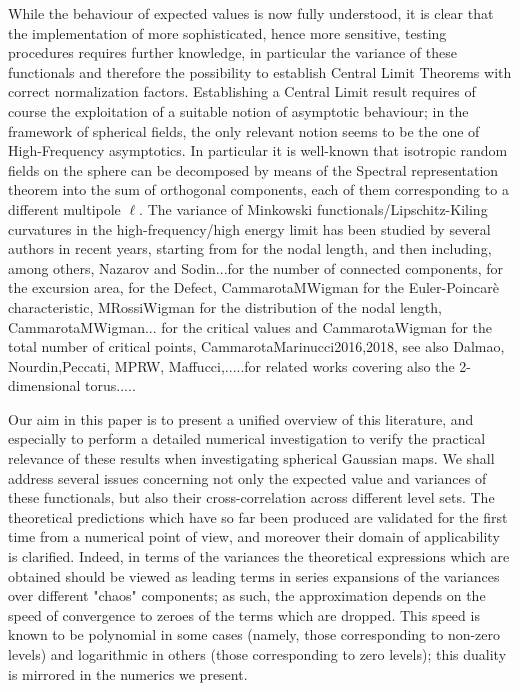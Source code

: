 \documentclass[aps,prd,showpacs,superscriptaddress,groupedaddress]{revtex4-1}  %
\begin{document}
While the behaviour of expected values is now fully understood, it is clear that the implementation of more sophisticated, hence more sensitive, testing procedures requires further knowledge, in particular the variance of these functionals and therefore the possibility to establish Central Limit Theorems with correct normalization factors. Establishing a Central Limit result requires of course the exploitation of a suitable notion of asymptotic behaviour; in the framework of spherical fields, the only relevant notion seems to be the one of High-Frequency asymptotics. In particular it is well-known that isotropic random fields on the sphere can be decomposed by means of the Spectral representation theorem into the sum of orthogonal components, each of them corresponding to a different multipole $\ell$. The variance of Minkowski functionals/Lipschitz-Kiling curvatures in the high-frequency/high energy limit has been studied by several authors in recent years, starting from \cite{W} for the nodal length, and then including, among others, Nazarov and Sodin...for the number of connected components, \cite{M e W 2011} for the excursion area, \cite{M e W 2011bis} for the Defect, CammarotaMWigman for the Euler-Poincarè characteristic, MRossiWigman for the distribution of the nodal length, CammarotaMWigman... for the critical values and CammarotaWigman for the total number of critical points, CammarotaMarinucci2016,2018, see also Dalmao, Nourdin,Peccati, MPRW, Maffucci,.....for related works covering also the 2-dimensional torus....\cite{cm1603}.


Our aim in this paper is to present a unified overview of this literature, and especially to perform a detailed numerical investigation to verify the practical relevance of these results when investigating spherical Gaussian maps. We shall address several issues concerning not only the expected value and variances of these functionals, but also their cross-correlation across different level sets. The theoretical predictions which have so far been produced are validated for the first time from a numerical point of view, and moreover their domain of applicability is clarified. Indeed, in terms of the variances the theoretical expressions which are obtained should be viewed as leading terms in series expansions of the variances over different "chaos" components; as such, the approximation depends on the speed of convergence to zeroes of the terms which are dropped. This speed is known to be polynomial in some cases (namely, those corresponding to non-zero levels) and logarithmic in others (those corresponding to zero levels); this duality is mirrored in the numerics we present.
\end{document}
